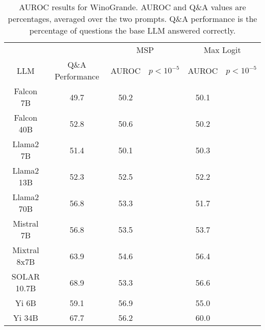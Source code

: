 \begin{table*}
\centering
\begin{tabular}{c|c|c|c|c|c}
& & \multicolumn{2}{c|}{MSP} & \multicolumn{2}{c}{Max Logit} \\ 
LLM & Q\&A Performance & AUROC & $p < 10^{-5}$ & AUROC & $p < 10^{-5}$\\ \hline
Falcon 7B & 49.7 & 50.2 &  & 50.1 & \\
Falcon 40B & 52.8 & 50.6 &  & 50.2 & \\
Llama2 7B & 51.4 & 50.1 &  & 50.3 & \\
Llama2 13B & 52.3 & 52.5 &  & 52.2 & \\
Llama2 70B & 56.8 & 53.3 &  & 51.7 & \\
Mistral 7B & 56.8 & 53.5 &  & 53.7 & \\
Mixtral 8x7B & 63.9 & 54.6 &  & 56.4 & \\
SOLAR 10.7B & 68.9 & 53.3 &  & 56.6 & \\
Yi 6B & 59.1 & 56.9 &  & 55.0 & \\
Yi 34B & 67.7 & 56.2 &  & 60.0 & \\
\hline
\end{tabular}
\caption{AUROC results for WinoGrande. AUROC and Q\&A values are percentages, averaged over the two prompts. Q\&A performance is the percentage of questions the base LLM answered correctly.}
\label{tab:winogrande_auroc}
\end{table*}
